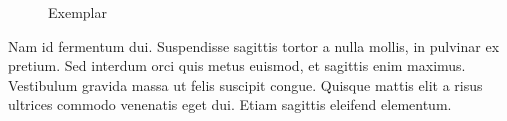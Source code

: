 \documentclass[sigconf]{acmart}
\begin{document}
\begin{figure}[h]
	\centering
	\caption{Exemplar}
\end{figure}

Nam id fermentum dui. Suspendisse sagittis tortor a nulla mollis, in
pulvinar ex pretium. Sed interdum orci quis metus euismod, et sagittis
enim maximus. Vestibulum gravida massa ut felis suscipit
congue. Quisque mattis elit a risus ultrices commodo venenatis eget
dui. Etiam sagittis eleifend elementum.
\end{document}
